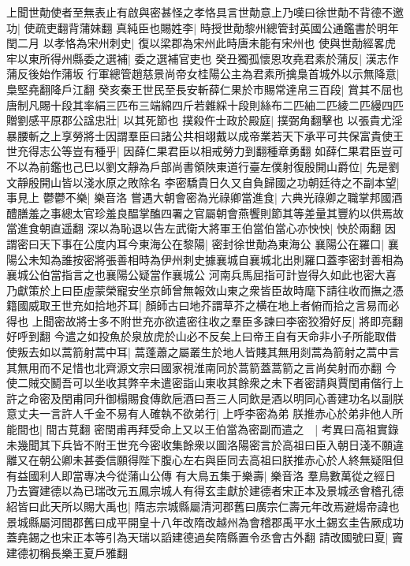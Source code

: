 上聞世勣使者至無表止有啟與密甚怪之孝恪具言世勣意上乃嘆曰徐世勣不背德不邀功|{
	使疏吏翻背蒲妹翻}
真純臣也賜姓李|{
	時授世勣黎州總管封英國公通鑑書於明年閏二月}
以孝恪為宋州刺史|{
	復以梁郡為宋州此時唐未能有宋州也}
使與世勣經畧虎牢以東所得州縣委之選補|{
	委之選補官吏也}
癸丑獨孤懷恩攻堯君素於蒲反|{
	漢志作蒲反後始作蒲坂}
行軍總管趙慈景尚帝女桂陽公主為君素所擒梟首城外以示無降意|{
	梟堅堯翻降戶江翻}
癸亥秦王世民至長安斬薛仁果於市賜常達帛三百段|{
	賞其不屈也唐制凡賜十段其率絹三匹布三端綿四斤若雜綵十段則絲布二匹紬二匹綾二匹縵四匹}
贈劉感平原郡公諡忠壯|{
	以其死節也}
撲殺仵士政於殿庭|{
	撲弼角翻擊也}
以張貴尤淫暴腰斬之上享勞將士因謂羣臣曰諸公共相翊戴以成帝業若天下承平可共保富貴使王世充得志公等豈有種乎|{
	因薛仁果君臣以相戒勞力到翻種章勇翻}
如薛仁果君臣豈可不以為前鑑也己巳以劉文靜為戶部尚書領陜東道行臺左僕射復殷開山爵位|{
	先是劉文靜殷開山皆以淺水原之敗除名}
李密驕貴日久又自負歸國之功朝廷待之不副本望|{
	事見上}
鬱鬱不樂|{
	樂音洛}
嘗遇大朝會密為光祿卿當進食|{
	六典光祿卿之職掌邦國酒醴膳羞之事總太官珍羞良醖掌醢四署之官屬朝會燕饗則節其等差量其豐約以供焉故當進食朝直遥翻}
深以為恥退以告左武衛大將軍王伯當伯當心亦怏怏|{
	怏於兩翻}
因謂密曰天下事在公度内耳今東海公在黎陽|{
	密封徐世勣為東海公}
襄陽公在羅口|{
	襄陽公未知為誰按密將張善相時為伊州刺史據襄城自襄城北出則羅口蓋李密封善相為襄城公伯當指言之也襄陽公疑當作襄城公}
河南兵馬屈指可計豈得久如此也密大喜乃獻策於上曰臣虛蒙榮寵安坐京師曾無報效山東之衆皆臣故時麾下請往收而撫之憑籍國威取王世充如拾地芥耳|{
	顏師古曰地芥謂草芥之横在地上者俯而拾之言易而必得也}
上聞密故將士多不附世充亦欲遣密往收之羣臣多諫曰李密狡猾好反|{
	將即亮翻好呼到翻}
今遣之如投魚於泉放虎於山必不反矣上曰帝王自有天命非小子所能取借使叛去如以蒿箭射蒿中耳|{
	蒿蓬蕭之屬叢生於地人皆賤其無用剡蒿為箭射之蒿中言其無用而不足惜也北齊源文宗曰國家視淮南同於蒿箭蓋蒿箭之言尚矣射而亦翻}
今使二賊交鬭吾可以坐收其弊辛未遣密詣山東收其餘衆之未下者密請與賈閏甫偕行上許之命密及閏甫同升御榻賜食傳飲巵酒曰吾三人同飲是酒以明同心善建功名以副朕意丈夫一言許人千金不易有人確執不欲弟行|{
	上呼李密為弟}
朕推赤心於弟非他人所能間也|{
	間古莧翻}
密閏甫再拜受命上又以王伯當為密副而遣之　|{
	考異曰高祖實錄未幾聞其下兵皆不附王世充今密收集餘衆以圖洛陽密言於高祖曰臣入朝日淺不願違離又在朝公卿未甚委信願得陛下腹心左右與臣同去高祖曰朕推赤心於人終無疑阻但有益國利人即當專决今從蒲山公傳}
有大鳥五集于樂壽|{
	樂音洛}
羣鳥數萬從之經日乃去竇建德以為已瑞改元五鳳宗城人有得玄圭獻於建德者宋正本及景城丞會稽孔德紹皆曰此天所以賜大禹也|{
	隋志宗城縣屬清河郡舊曰廣宗仁壽元年改焉避煬帝諱也景城縣屬河間郡舊曰成平開皇十八年改隋改越州為會稽郡禹平水土錫玄圭告厥成功蓋堯錫之也宋正本等引為天瑞以謟建德過矣隋縣置令丞會古外翻}
請改國號曰夏|{
	竇建德初稱長樂王夏戶雅翻}
